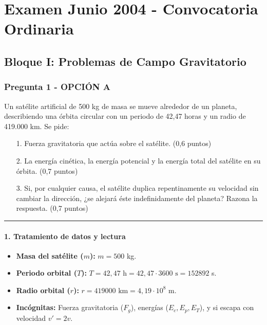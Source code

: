 \chapter{Examen Junio 2004 - Convocatoria Ordinaria}
\label{chap:2004_jun_ord}

\section{Bloque I: Problemas de Campo Gravitatorio}
\label{sec:grav_2004_jun_ord}

\subsection{Pregunta 1 - OPCIÓN A}
\label{subsec:1A_2004_jun_ord}

\begin{cajaenunciado}
Un satélite artificial de 500 kg de masa se mueve alrededor de un planeta, describiendo una órbita circular con un periodo de 42,47 horas y un radio de 419.000 km. Se pide:
\begin{enumerate}
    \item[1.] Fuerza gravitatoria que actúa sobre el satélite. (0,6 puntos)
    \item[2.] La energía cinética, la energía potencial y la energía total del satélite en su órbita. (0,7 puntos)
    \item[3.] Si, por cualquier causa, el satélite duplica repentinamente su velocidad sin cambiar la dirección, ¿se alejará éste indefinidamente del planeta? Razona la respuesta. (0,7 puntos)
\end{enumerate}
\end{cajaenunciado}
\hrule

\subsubsection*{1. Tratamiento de datos y lectura}
\begin{itemize}
    \item \textbf{Masa del satélite ($m$):} $m = 500$ kg.
    \item \textbf{Periodo orbital ($T$):} $T = 42,47 \text{ h} = 42,47 \cdot 3600 \text{ s} = 152892$ s.
    \item \textbf{Radio orbital ($r$):} $r = 419000 \text{ km} = 4,19 \cdot 10^8$ m.
    \item \textbf{Incógnitas:} Fuerza gravitatoria ($F_g$), energías ($E_c, E_p, E_T$), y si escapa con velocidad $v' = 2v$.
\end{itemize}


